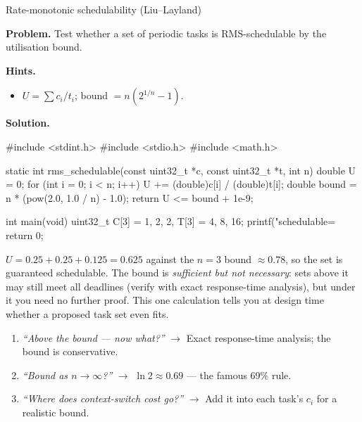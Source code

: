 \begin{gymproblem}{Rate-monotonic schedulability (Liu--Layland)}

\textbf{Problem.} Test whether a set of periodic tasks is RMS-schedulable by the
utilisation bound.

\textbf{Hints.}
\begin{itemize}
\item $U=\sum c_i/t_i$; bound $= n(2^{1/n}-1)$.
\end{itemize}

\attempt

\textbf{Solution.}
\begin{cgym}
#include <stdint.h>
#include <stdio.h>
#include <math.h>

static int rms_schedulable(const uint32_t *c, const uint32_t *t, int n) {
    double U = 0;
    for (int i = 0; i < n; i++) U += (double)c[i] / (double)t[i];
    double bound = n * (pow(2.0, 1.0 / n) - 1.0);
    return U <= bound + 1e-9;
}

int main(void) {
    uint32_t C[3] = {1, 2, 2}, T[3] = {4, 8, 16};
    printf("schedulable=%
    return 0;
}
\end{cgym}

$U = 0.25 + 0.25 + 0.125 = 0.625$ against the $n=3$ bound $\approx 0.78$, so the
set is guaranteed schedulable. The bound is \emph{sufficient but not necessary}:
sets above it may still meet all deadlines (verify with exact response-time
analysis), but under it you need no further proof. This one calculation tells you
at design time whether a proposed task set even fits.

\followups
\begin{enumerate}
\item \emph{``Above the bound --- now what?''} $\rightarrow$ Exact
  response-time analysis; the bound is conservative.
\item \emph{``Bound as $n\to\infty$?''} $\rightarrow$ $\ln 2 \approx 0.69$ ---
  the famous 69\% rule.
\item \emph{``Where does context-switch cost go?''} $\rightarrow$ Add it into
  each task's $c_i$ for a realistic bound.
\end{enumerate}
\end{gymproblem}

